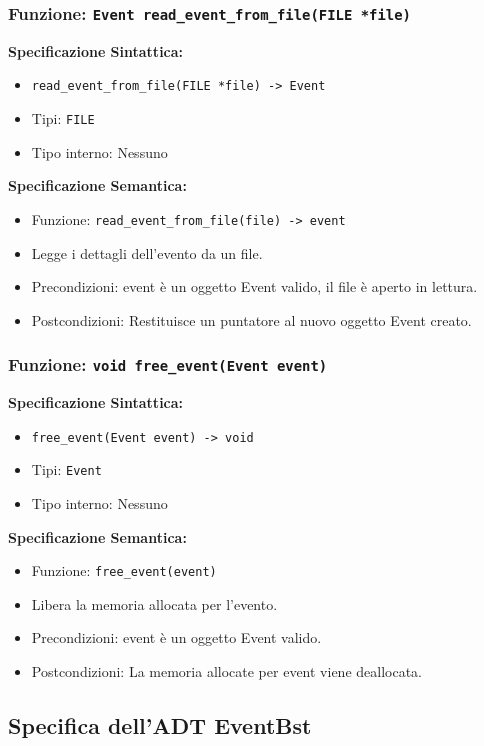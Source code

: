 \documentclass[11pt]{scrartcl} %
\begin{document}
\subsubsection{Funzione: \texttt{Event read\_event\_from\_file(FILE *file)}}

\textbf{Specificazione Sintattica:}
\begin{itemize}
\item \texttt{read\_event\_from\_file(FILE *file) -> Event}
\item Tipi: \texttt{FILE}
\item Tipo interno: Nessuno
\end{itemize}

\textbf{Specificazione Semantica:}
\begin{itemize}
\item Funzione: \texttt{read\_event\_from\_file(file) -> event}
\item Legge i dettagli dell'evento da un file.
\item Precondizioni: event è un oggetto Event valido, il file è aperto in lettura.
\item Postcondizioni: Restituisce un puntatore al nuovo oggetto Event creato.
\end{itemize}

\subsubsection{Funzione: \texttt{void free\_event(Event event)}}

\textbf{Specificazione Sintattica:}
\begin{itemize}
\item \texttt{free\_event(Event event) -> void}
\item Tipi: \texttt{Event}
\item Tipo interno: Nessuno
\end{itemize}

\textbf{Specificazione Semantica:}
\begin{itemize}
\item Funzione: \texttt{free\_event(event)}
\item Libera la memoria allocata per l'evento.
\item Precondizioni: event è un oggetto Event valido.
\item Postcondizioni: La memoria allocate per event viene deallocata.
\end{itemize}


\subsection{Specifica dell'ADT EventBst}
\end{document}
